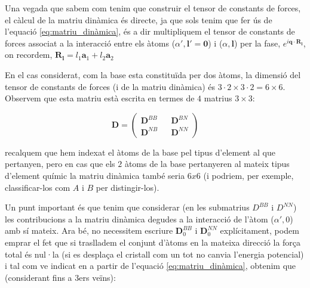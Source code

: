 \documentclass[12pt]{article} %
\let\vec\mathbf %
\begin{document}
Una vegada que sabem com tenim que construir el tensor de constants de forces, el càlcul de la matriu dinàmica és directe, ja que sols tenim que fer ús de l'equació \ref{eq:matriu_dinàmica}, és a dir multipliquem el tensor de constants de forces associat a la interacció entre els àtoms ($\alpha', \vec l'=\vec 0$) i ($\alpha,\vec l$) per la fase, $e^{i \vec q\cdot \vec R_\vec l}$, on recordem, $\vec R_\vec l=l_1 \vec a_1+ l_2 \vec a_2$

En el cas considerat, com la base esta constituïda per dos àtoms, la dimensió del tensor de constants de forces (i de la matriu dinàmica) és $3\cdot 2\times 3\cdot 2= 6\times 6$. Observem que esta matriu està escrita en termes de $4$ matrius $3\times 3$:

\begin{equation}
 \label{eq:formamatriudinamica}
 \mathbf D=
 \begin{pmatrix}
  \mathbf D^{BB} && \mathbf D^{BN}\\
  \mathbf D^{NB} && \mathbf D^{NN}
 \end{pmatrix}
\end{equation}

recalquem que hem indexat el àtoms de la base pel tipus d'element al que pertanyen, pero en cas que els $2$ àtoms de la base pertanyeren al mateix tipus d'element químic la matriu dinàmica també seria $6x6$ (i podriem, per exemple, classificar-los com $A$ i $B$ per distingir-los).

Un punt important és que tenim que considerar (en les submatrius $D^{BB}$ i $D^{NN}$) les contribucions a la matriu dinàmica degudes a la interacció de l'àtom ($\alpha',0$) amb sí mateix. Ara bé, no necessitem escriure $\vec D_0^{BB}$ i $\vec D_0^{NN}$ explícitament, podem emprar el fet que si traslladem el conjunt d'àtoms en la mateixa direcció la força total és nul·la (si es desplaça el cristall com un tot no canvia l'energia potencial) i tal com ve indicat en \cite{falkovsky08_symmet_const_phonon_disper_graph} a partir de l'equació \ref{eq:matriu_dinàmica}, obtenim que (considerant fins a 3ers veïns):

\end{document}
